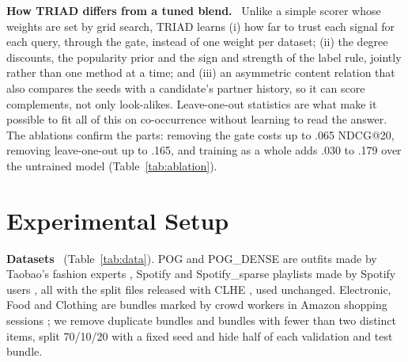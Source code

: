 \documentclass[runningheads]{llncs}
\renewcommand{\paragraph}[1]{\smallskip\noindent\textbf{#1}\ }
\begin{document}
\paragraph{How TRIAD differs from a tuned blend.} Unlike a simple scorer whose weights are set by grid search,
TRIAD learns (i) how far to trust each signal for each query, through the gate, instead of one weight per dataset;
(ii) the degree discounts, the popularity prior and the sign and strength of the label rule, jointly rather than one
method at a time; and (iii) an asymmetric content relation that also compares the seeds with a candidate's partner
history, so it can score complements, not only look-alikes. Leave-one-out statistics are what make it possible to fit
all of this on co-occurrence without learning to read the answer. The ablations confirm the parts: removing the gate
costs up to .065 NDCG@20, removing leave-one-out up to .165, and training as a whole adds .030 to .179 over the
untrained model (Table~\ref{tab:ablation}).

\section{Experimental Setup}

\paragraph{Datasets} (Table~\ref{tab:data}). POG and POG\_DENSE are outfits made by Taobao's fashion experts
\cite{pog}, Spotify and Spotify\_sparse playlists made by Spotify users \cite{spotify}, all with the split files
released with CLHE \cite{clhe}, used unchanged. Electronic, Food and Clothing are bundles marked by crowd workers in
Amazon shopping sessions \cite{bundlerec}; we remove duplicate bundles and bundles with fewer than two distinct items,
split 70/10/20 with a fixed seed and hide half of each validation and test bundle.
\end{document}
